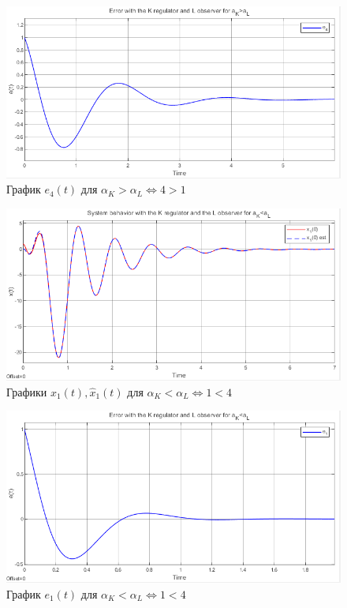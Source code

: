 \documentclass[a4paper, 12pt]{article}
\begin{document}
    \begin{figure}[H]
        \centering
        \includegraphics[scale=0.8]{2task_aKgaL_e4.png}
        \captionsetup{skip=0pt}
        \caption{График $e_4(t)$ для $\alpha_K>\alpha_L\Leftrightarrow4>1$}
        \label{2task_aKgaL_e4}
    \end{figure}
    \newpage
    \vspace*{20mm}
    \begin{figure}[H]
        \centering
        \includegraphics[scale=0.8]{2task_aKlaL_x1.png}
        \captionsetup{skip=0pt}
        \caption{Графики $x_1(t),\hat{x}_1(t)$ для $\alpha_K<\alpha_L\Leftrightarrow1<4$}
        \label{2task_aKlaL_x1}
    \end{figure}
    \begin{figure}[H]
        \centering
        \includegraphics[scale=0.8]{2task_aKlaL_e1.png}
        \captionsetup{skip=0pt}
        \caption{График $e_1(t)$ для $\alpha_K<\alpha_L\Leftrightarrow1<4$}
        \label{2task_aKlaL_e1}
    \end{figure}
\end{document}
